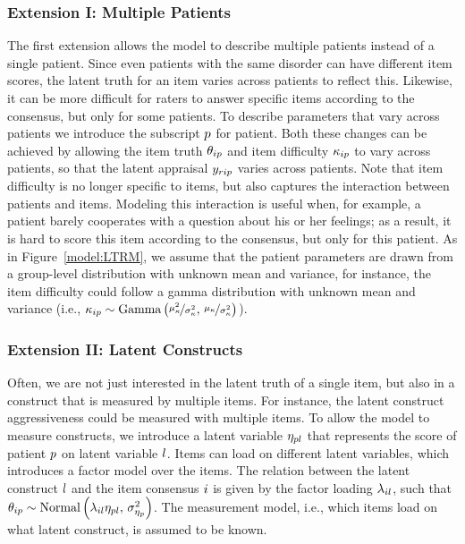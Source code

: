 \documentclass[a4paper,usenames,dvipsnames]{article}
\newenvironment{revision}{\color{teal}}{\color{black}}
\begin{document}
\subsubsection*{Extension I: Multiple Patients}
The first extension allows the model to describe multiple patients instead of a single patient. Since even patients with the same disorder can have different item scores, the latent truth for an item varies across patients to reflect this. \begin{revision}Likewise, it can be\end{revision} more difficult for raters to answer specific items according to the consensus, but only for some patients. To describe parameters that vary across patients we introduce the subscript $p$ for patient. Both these changes can be achieved by allowing the item truth $\theta_{ip}$ and item difficulty $\kappa_{ip}$ to vary across patients, so that the latent appraisal $y_{rip}$ varies across patients. Note that item difficulty is no longer specific to items, but also captures the interaction between patients and items. Modeling this interaction is useful when, for example, a patient barely cooperates with a question about his or her feelings; as a result, it is hard to score this item according to the consensus, but only for this patient. As in Figure~\ref{model:LTRM}, we assume that the patient parameters are drawn from a group-level distribution with unknown mean and variance, for instance, the item difficulty could follow a gamma distribution with unknown mean and variance (i.e., $\kappa_{ip} \sim \text{Gamma}\left(\nicefrac{\mu_\kappa^2}{\sigma_\kappa^2},\,\nicefrac{\mu_\kappa}{\sigma_\kappa^2}\right)$).

\subsubsection*{Extension II: Latent Constructs}
Often, we are not just interested in the latent truth of a single item, but also in a construct that is measured by multiple items. For instance, the latent construct aggressiveness could be measured with multiple items. To allow the model to measure constructs, we introduce a latent variable $\eta_{pl}$ that represents the score of patient $p$ on latent variable $l$. Items can load on different latent variables, which introduces a factor model over the items. The relation between the latent construct $l$ and the item consensus $i$ is given by the factor loading $\lambda_{il}$, such that $\theta_{ip} \sim \text{Normal}\left(\lambda_{il}\eta_{pl},\,\sigma^2_{\eta_{p}}\right)$. The measurement model, i.e., which items load on what latent construct, is assumed to be known.
\end{document}
